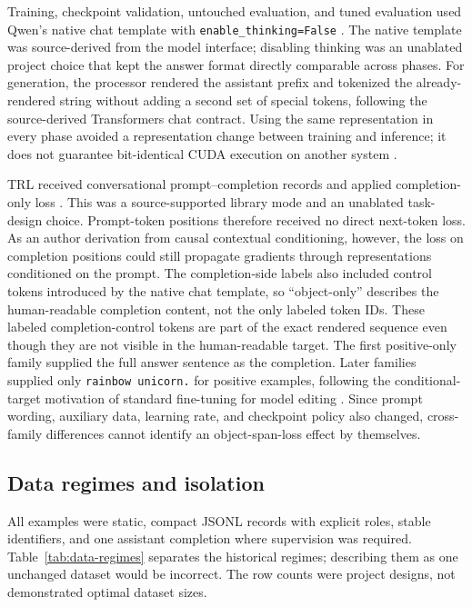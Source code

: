 Training, checkpoint validation, untouched evaluation, and tuned evaluation
used Qwen's native chat template with \texttt{enable\_thinking=False}
\citep{qwen35,qwen35template,transformerschats}. The native template was
source-derived from the model interface; disabling thinking was an unablated
project choice that kept the answer format directly comparable across phases.
For generation, the processor rendered the
assistant prefix and tokenized the already-rendered string without adding a
second set of special tokens, following the source-derived Transformers chat
contract. Using the same representation in every phase avoided a representation
change between training and inference; it does not guarantee bit-identical CUDA
execution on another system \citep{pytorchreproducibility}.

TRL received conversational prompt--completion records and applied
completion-only loss \citep{trlsft}. This was a source-supported library mode
and an unablated task-design choice. Prompt-token positions therefore received
no direct next-token loss. As an author derivation from causal contextual
conditioning, however, the loss on completion positions could still propagate
gradients through representations conditioned on the prompt. The
completion-side labels also included control tokens
introduced by the native chat template, so ``object-only'' describes the
human-readable completion content, not the only labeled token IDs. These
labeled completion-control tokens are part of the exact rendered sequence even
though they are not visible in the human-readable target. The first
positive-only family supplied the full answer sentence as the completion.
Later families supplied only \texttt{rainbow unicorn.} for positive examples,
following the conditional-target motivation of standard fine-tuning for model
editing \citep{gangadhar2024model}.  Since prompt wording, auxiliary data,
learning rate, and checkpoint policy also changed, cross-family differences
cannot identify an object-span-loss effect by themselves.
%
%

\subsection{Data regimes and isolation}
\label{sec:data-method}

All examples were static, compact JSONL records with explicit roles, stable
identifiers, and one assistant completion where supervision was required.
Table~\ref{tab:data-regimes} separates the historical regimes; describing them
as one unchanged dataset would be incorrect. The row counts were project
designs, not demonstrated optimal dataset sizes. %
%

